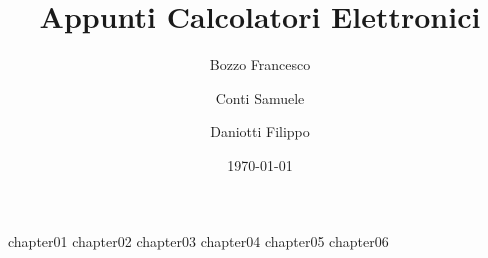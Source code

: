 \documentclass[a4paper,12pt]{book}
\author{Bozzo Francesco \and Conti Samuele \and Daniotti Filippo}
\title{Appunti Calcolatori Elettronici}
\date{\today}
\begin{document}
	\frontmatter
	\maketitle
	\tableofcontents

	\mainmatter

	{chapter01}
	{chapter02}
	{chapter03}
	{chapter04}
	{chapter05}
	{chapter06}

	\backmatter
\end{document}

